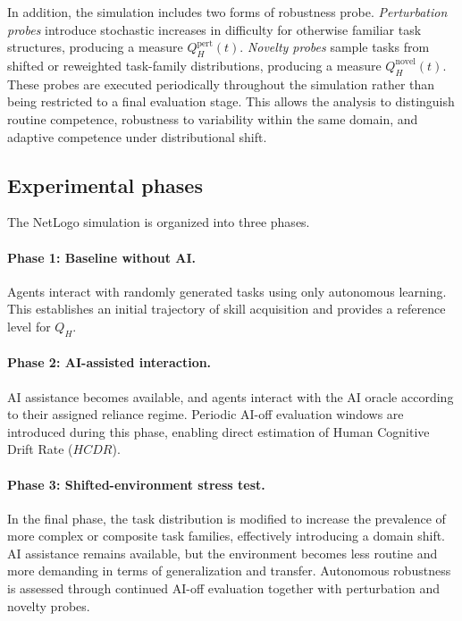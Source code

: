 \documentclass[11pt,a4paper]{article}
\begin{document}
In addition, the simulation includes two forms of robustness probe. \emph{Perturbation probes} introduce stochastic increases in difficulty for otherwise familiar task structures, producing a measure $Q_H^{\mathrm{pert}}(t)$. \emph{Novelty probes} sample tasks from shifted or reweighted task-family distributions, producing a measure $Q_H^{\mathrm{novel}}(t)$. These probes are executed periodically throughout the simulation rather than being restricted to a final evaluation stage. This allows the analysis to distinguish routine competence, robustness to variability within the same domain, and adaptive competence under distributional shift.

\subsection{Experimental phases}

The NetLogo simulation is organized into three phases.

\paragraph{Phase 1: Baseline without AI.}
Agents interact with randomly generated tasks using only autonomous learning. This establishes an initial trajectory of skill acquisition and provides a reference level for $Q_H$.

\paragraph{Phase 2: AI-assisted interaction.}
AI assistance becomes available, and agents interact with the AI oracle according to their assigned reliance regime. Periodic AI-off evaluation windows are introduced during this phase, enabling direct estimation of Human Cognitive Drift Rate ($HCDR$).

\paragraph{Phase 3: Shifted-environment stress test.}
In the final phase, the task distribution is modified to increase the prevalence of more complex or composite task families, effectively introducing a domain shift. AI assistance remains available, but the environment becomes less routine and more demanding in terms of generalization and transfer. Autonomous robustness is assessed through continued AI-off evaluation together with perturbation and novelty probes.
\end{document}
